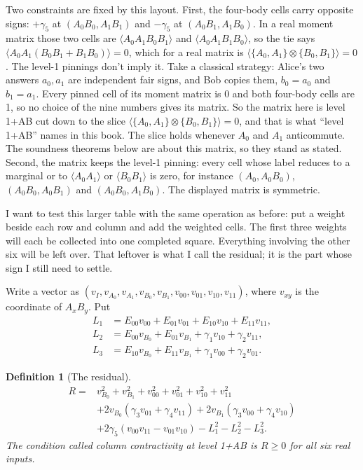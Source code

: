 \documentclass[11pt,twoside]{article}
\theoremstyle{thielethm}
\theoremstyle{thieledef}
\newtheorem{definition}{Definition}[section]
\theoremstyle{thieledef}
\theoremstyle{thieledef}
\theoremstyle{thielethm}
\theoremstyle{thieleobs}
\theoremstyle{thielethm}
\begin{document}
Two constraints are fixed by this layout. First, the four-body cells carry opposite signs:
$+\gamma_5$ at $(A_0B_0, A_1B_1)$ and $-\gamma_5$ at $(A_0B_1, A_1B_0)$. In a real
moment matrix those two cells are $\langle A_0 A_1 B_0 B_1 \rangle$ and $\langle A_0 A_1 B_1 B_0
\rangle$, so the tie says $\langle A_0 A_1 (B_0 B_1 + B_1 B_0) \rangle = 0$, which for a real
matrix is $\langle \{A_0, A_1\} \otimes \{B_0, B_1\} \rangle = 0$. The level-1 pinnings don't
imply it. Take a classical strategy: Alice's two answers $a_0, a_1$ are independent fair signs,
and Bob copies them, $b_0 = a_0$ and $b_1 = a_1$. Every pinned cell of its moment matrix is 0 and
both four-body cells are 1, so no choice of the nine numbers gives its matrix. So the matrix
here is level 1+AB cut down to the slice $\langle \{A_0, A_1\} \otimes \{B_0, B_1\} \rangle = 0$,
and that is what ``level 1+AB'' names in this book. The slice holds whenever $A_0$ and $A_1$ anticommute.
The soundness theorems below are about this matrix, so they stand as stated. Second, the matrix
keeps the level-1 pinning: every cell whose label reduces to a marginal or to
$\langle A_0 A_1 \rangle$ or $\langle B_0 B_1 \rangle$ is zero, for instance
$(A_0, A_0B_0)$, $(A_0B_0, A_0B_1)$ and $(A_0B_0, A_1B_0)$. The displayed matrix is symmetric.

I want to test this larger table with the same operation as before:
put a weight beside each row and column and add the weighted cells. The
first three weights will each be collected into one completed square.
Everything involving the other six will be left over. That leftover is
what I call the residual; it is the part whose sign I still need to settle.

Write a vector as $(v_I, v_{A_0}, v_{A_1}, v_{B_0}, v_{B_1}, v_{00}, v_{01}, v_{10}, v_{11})$,
where $v_{xy}$ is the coordinate of $A_xB_y$. Put
\[
\begin{aligned}
L_1 &= E_{00} v_{00} + E_{01} v_{01} + E_{10} v_{10} + E_{11} v_{11}, \\
L_2 &= E_{00} v_{B_0} + E_{01} v_{B_1} + \gamma_1 v_{10} + \gamma_2 v_{11}, \\
L_3 &= E_{10} v_{B_0} + E_{11} v_{B_1} + \gamma_1 v_{00} + \gamma_2 v_{01}.
\end{aligned}
\]

\begin{definition}[The residual]
\[
\begin{aligned}
R ={}& v_{B_0}^2 + v_{B_1}^2 + v_{00}^2 + v_{01}^2 + v_{10}^2 + v_{11}^2 \\
&+ 2 v_{B_0} (\gamma_3 v_{01} + \gamma_4 v_{11}) + 2 v_{B_1} (\gamma_3 v_{00} + \gamma_4 v_{10}) \\
&+ 2 \gamma_5 (v_{00} v_{11} - v_{01} v_{10}) - L_1^2 - L_2^2 - L_3^2.
\end{aligned}
\]
The condition called column contractivity at level 1+AB is $R \ge 0$ for all six real inputs.
\end{definition}
\end{document}
